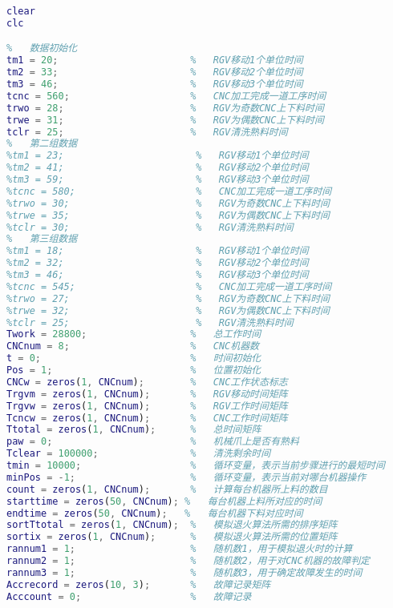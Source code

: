 \documentclass[no-math,withoutpreface,bwprint]{cumcmthesis} %
\numberwithin{equation}{section}
\numberwithin{figure}{section}
\numberwithin{table}{section}
\begin{document}
\begin{lstlisting}[language=matlab]
%   初始化MATLAB
clear
clc

%   数据初始化
tm1 = 20;                       %   RGV移动1个单位时间
tm2 = 33;                       %   RGV移动2个单位时间
tm3 = 46;                       %   RGV移动3个单位时间
tcnc = 560;                     %   CNC加工完成一道工序时间
trwo = 28;                      %   RGV为奇数CNC上下料时间
trwe = 31;                      %   RGV为偶数CNC上下料时间
tclr = 25;                      %   RGV清洗熟料时间
%   第二组数据
%tm1 = 23;                       %   RGV移动1个单位时间
%tm2 = 41;                       %   RGV移动2个单位时间
%tm3 = 59;                       %   RGV移动3个单位时间
%tcnc = 580;                     %   CNC加工完成一道工序时间
%trwo = 30;                      %   RGV为奇数CNC上下料时间
%trwe = 35;                      %   RGV为偶数CNC上下料时间
%tclr = 30;                      %   RGV清洗熟料时间
%   第三组数据
%tm1 = 18;                       %   RGV移动1个单位时间
%tm2 = 32;                       %   RGV移动2个单位时间
%tm3 = 46;                       %   RGV移动3个单位时间
%tcnc = 545;                     %   CNC加工完成一道工序时间
%trwo = 27;                      %   RGV为奇数CNC上下料时间
%trwe = 32;                      %   RGV为偶数CNC上下料时间
%tclr = 25;                      %   RGV清洗熟料时间
Twork = 28800;                  %   总工作时间
CNCnum = 8;                     %   CNC机器数
t = 0;                          %   时间初始化
Pos = 1;                        %   位置初始化
CNCw = zeros(1, CNCnum);        %   CNC工作状态标志
Trgvm = zeros(1, CNCnum);       %   RGV移动时间矩阵
Trgvw = zeros(1, CNCnum);       %   RGV工作时间矩阵
Tcncw = zeros(1, CNCnum);       %   CNC工作时间矩阵
Ttotal = zeros(1, CNCnum);      %   总时间矩阵
paw = 0;                        %   机械爪上是否有熟料
Tclear = 100000;                %   清洗剩余时间
tmin = 10000;                   %   循环变量，表示当前步骤进行的最短时间
minPos = -1;                    %   循环变量，表示当前对哪台机器操作
count = zeros(1, CNCnum);       %   计算每台机器所上料的数目
starttime = zeros(50, CNCnum); %   每台机器上料所对应的时间
endtime = zeros(50, CNCnum);   %   每台机器下料对应时间
sortTtotal = zeros(1, CNCnum);  %   模拟退火算法所需的排序矩阵
sortix = zeros(1, CNCnum);      %   模拟退火算法所需的位置矩阵
rannum1 = 1;                    %   随机数1，用于模拟退火时的计算
rannum2 = 1;                    %   随机数2，用于对CNC机器的故障判定
rannum3 = 1;                    %   随机数3，用于确定故障发生的时间
Accrecord = zeros(10, 3);       %   故障记录矩阵
Acccount = 0;                   %   故障记录


\end{lstlisting}
\end{document}
